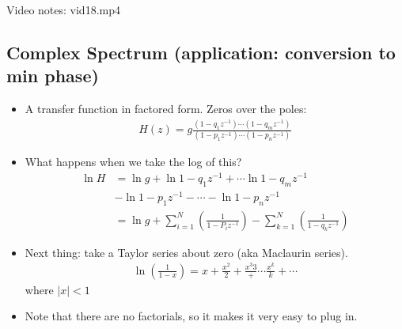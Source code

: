 Video notes: vid18.mp4
\subsection*{Complex Spectrum (application: conversion to min phase)}
\begin{itemize}
\item{
A transfer function in factored form. Zeros over the poles:
\begin{align*}
H(z) = g\frac{
    (1-q_1z^{-1}) \cdots
    (1-q_mz^{-1})
}{
    (1-p_1z^{-1}) \cdots
    (1-p_nz^{-1})
}
\end{align*}
}
\item{
What happens when we take the log of this? 
\begin{align*}
\ln{H} & = \ln{g} + \ln{1 - q_1 z^{-1}} + \cdots \ln{1 - q_m z^{-1}} \\
& - \ln{1 - p_1 z^{-1}} - \cdots - \ln{1 - p_n z^{-1}}\\
& = \ln{g} + 
\sum\limits_{i = 1}^{N} ( \frac{ 1 } { 1 - P_i z^{-1}})
- \sum\limits_{k = 1}^{N} ( \frac{ 1 } { 1 - q_k z^{-1}})
\end{align*}
}
\item{
Next thing: take a Taylor series about zero (aka Maclaurin series).
\begin{align*}
\ln (\frac{1}{1 - x}) = x + 
\frac{x^2}{2} + \frac{x^{3}{3}} + \cdots \frac{x^{k}}{k} + \cdots
\end{align*}
where $\vert x \vert < 1$
}
\item{ 
Note that there are no factorials, so it makes it very easy to plug in. 
}
\end{itemize}
